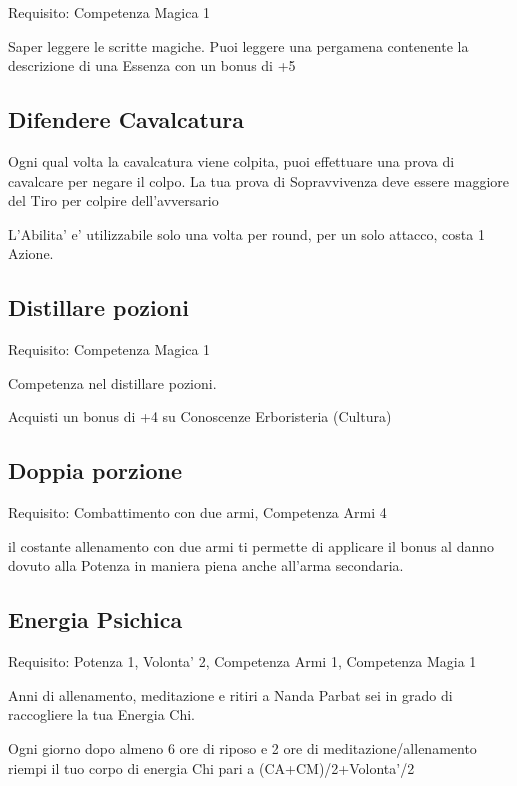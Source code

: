 \documentclass[a4paper,11pt,twoside,openany]{dndbook}
\begin{document}
Requisito: Competenza Magica 1

Saper leggere le scritte magiche. Puoi leggere una pergamena contenente la descrizione di una Essenza con un bonus di +5

\subsection{Difendere Cavalcatura}

Ogni qual volta la cavalcatura viene colpita, puoi effettuare una prova di cavalcare per negare il colpo. La tua prova di Sopravvivenza deve essere maggiore del Tiro per colpire dell'avversario

L'Abilita' e' utilizzabile solo una volta per round, per un solo attacco, costa 1 Azione.

\subsection{Distillare pozioni}

Requisito: Competenza Magica 1

Competenza nel distillare pozioni.

Acquisti un bonus di +4 su Conoscenze Erboristeria (Cultura)

\subsection{Doppia porzione}

Requisito: Combattimento con due armi, Competenza Armi 4

il costante allenamento con due armi ti permette di applicare il bonus al danno dovuto alla Potenza in maniera piena anche all'arma secondaria. 

\subsection{Energia Psichica}

Requisito: Potenza 1, Volonta' 2, Competenza Armi 1, Competenza Magia
1

Anni di allenamento, meditazione e ritiri a Nanda Parbat sei in grado di raccogliere la tua Energia Chi.

Ogni giorno dopo almeno 6 ore di riposo e 2 ore di meditazione/allenamento riempi il tuo corpo di energia Chi pari a (CA+CM)/2+Volonta'/2
\end{document}
